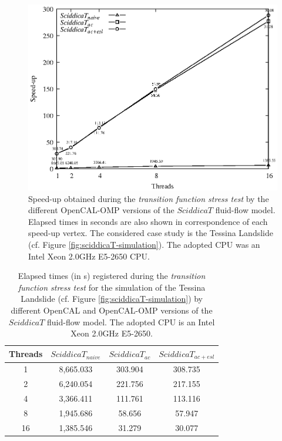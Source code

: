 \begin{figure}
	\begin{center}
		\includegraphics[width=1.0\textwidth]{./images/opencal/Figure09_new}
		\caption{Speed-up obtained during the \emph{transition
				function stress test} by the different OpenCAL-OMP
			versions of the $SciddicaT$ fluid-flow model. Elapsed times
			in seconds are also shown in correspondence of each speed-up
			vertex. The considered case study is the Tessina Landslide
			(cf. Figure \ref{fig:sciddicaT-simulation}). The adopted CPU
			was an Intel Xeon 2.0GHz E5-2650 CPU.}
		\label{gr:sciddicaT-OMP-absolute-speed-up-stress}
	\end{center}
\end{figure}

\begin{table}
	\centering
	\begin{tabular}{cccc}
		\hline Threads & $SciddicaT_{naive}$ & $SciddicaT_{ac}$ &
		$SciddicaT_{ac+esl}$ \\ \hline 1 & 8,665.033 & 303.904 &
		308.735\\ 2 & 6,240.054 & 221.756 & 217.155\\ 4 & 3,366.411 &
		111.761 & 113.116\\ 8 & 1,945.686 & 58.656 & 57.947\\ 16 &
		1,385.546 & 31.279 & 30.077\\ \hline
	\end{tabular}
	\caption[Elapsed times (in \si{s}) registered during the \emph{transition function stress test} by different OpenCAL and
	OpenCAL-OMP versions of the $SciddicaT$ fluid-flow model.]{Elapsed times (in \si{s}) registered during the \emph{transition function stress test} for the simulation of the Tessina Landslide
		(cf. Figure \ref{fig:sciddicaT-simulation}) by different OpenCAL and
		OpenCAL-OMP versions of the $SciddicaT$ fluid-flow model. The adopted
		CPU is an Intel Xeon 2.0GHz E5-2650.}
	\label{tab:sciddicaT-OMP-execution-times-stress}
\end{table}


